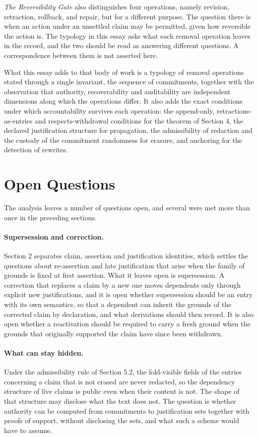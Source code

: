 \documentclass[11pt]{article}
\theoremstyle{plain}
\theoremstyle{definition}
\theoremstyle{remark}
\begin{document}
\emph{The Reversibility Gate} also distinguishes four operations, namely revision, retraction, rollback, and repair, but for a different purpose. The question there is when an action under an unsettled claim may be permitted, given how reversible the action is. The typology in this essay asks what each removal operation leaves in the record, and the two should be read as answering different questions. A correspondence between them is not asserted here.

What this essay adds to that body of work is a typology of removal operations stated through a single invariant, the sequence of commitments, together with the observation that authority, recoverability and auditability are independent dimensions along which the operations differ. It also adds the exact conditions under which accountability survives each operation: the append-only, retractions-as-entries and respects-withdrawal conditions for the theorem of Section 4, the declared justification structure for propagation, the admissibility of redaction and the custody of the commitment randomness for erasure, and anchoring for the detection of rewrites.

\section{Open Questions}
The analysis leaves a number of questions open, and several were met more than once in the preceding sections.

\paragraph{Supersession and correction.} Section 2 separates claim, assertion and justification identities, which settles the questions about re-assertion and late justification that arise when the family of grounds is fixed at first assertion. What it leaves open is supersession. A correction that replaces a claim by a new one moves dependents only through explicit new justifications, and it is open whether supersession should be an entry with its own semantics, so that a dependent can inherit the grounds of the corrected claim by declaration, and what derivations should then record. It is also open whether a reactivation should be required to carry a fresh ground when the grounds that originally supported the claim have since been withdrawn.

\paragraph{What can stay hidden.} Under the admissibility rule of Section 5.2, the fold-visible fields of the entries concerning a claim that is not erased are never redacted, so the dependency structure of live claims is public even when their content is not. The shape of that structure may disclose what the text does not. The question is whether authority can be computed from commitments to justification sets together with proofs of support, without disclosing the sets, and what such a scheme would have to assume.
\end{document}
